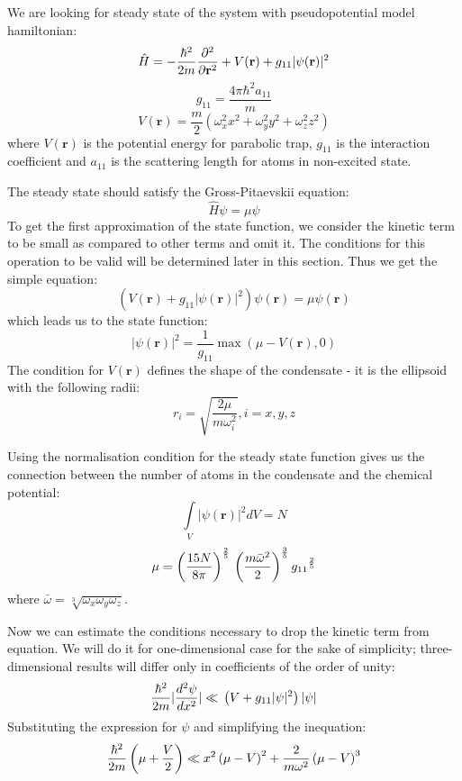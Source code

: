 \documentclass[12pt,notitlepage]{report}
\author{Bogdan Opanchuk}
\begin{document}
We are looking for steady state of the system with pseudopotential model hamiltonian:
\[ 
\hat{H} = -\frac{\hbar^2}{2m} \frac{\partial^2}{\partial \mathbf{r}^2} + \\
V(\mathbf{r}) + \\
g_{11} \vert \psi(\mathbf{r}) \vert^2 
\]
\[g_{11} = \frac{4 \pi \hbar^2 a_{11}}{m}\]
\[ V(\mathbf{r}) = \frac{m}{2} \left( \omega_x^2 x^2 + \omega_y^2 y^2 + \omega_z^2 z^2 \right) \]
where $V(\mathbf{r})$ is the potential energy for parabolic trap, $g_{11}$ is the interaction coefficient
and $a_{11}$ is the scattering length for atoms in non-excited state.

The steady state should satisfy the Gross-Pitaevskii equation:
\[ \hat{H} \psi = \mu \psi \]
To get the first approximation of the state function, we consider the kinetic term to be small as compared to other terms and omit it. The conditions for this operation to be valid will be determined later in this section. Thus we get the simple equation:
\[ \left( V(\mathbf{r}) + g_{11} \vert \psi(\mathbf{r}) \vert^2 \right) \psi(\mathbf{r}) = \mu \psi(\mathbf{r}) \]
which leads us to the state function:
\[ \vert \psi(\mathbf{r}) \vert^2 = \frac{1}{g_{11}} \max \left( \mu - V(\mathbf{r}), 0 \right) \]
The condition for $V(\mathbf{r})$ defines the shape of the condensate - it is the ellipsoid with the following radii:
\[ r_i = \sqrt{\frac{2 \mu}{m \omega_i^2}}, i = x, y, z \]

Using the normalisation condition for the steady state function gives us the connection between the number of atoms in the condensate and the chemical potential:
\[ \int\limits_{V} \vert \psi(\mathbf{r}) \vert^2 dV = N \]
\[ 
\mu = \left( \frac{15 N}{8 \pi} \right)^\frac{2}{5} \\
\left( \frac{m \bar{\omega}^2}{2} \right)^\frac{3}{5} \\
{g_{11}}^\frac{2}{5}
\]
where $\bar{\omega} = \sqrt[3]{\omega_x \omega_y \omega_z}$.

Now we can estimate the conditions necessary to drop the kinetic term from equation. We will do it for one-dimensional case for the sake of simplicity; three-dimensional results will differ only in coefficients of the order of unity:
\[ 
\frac{\hbar^2}{2 m} \vert \frac{d^2 \psi}{d x^2} \vert \ll \\
\left( V + g_{11} \vert \psi \vert^2 \right) \vert \psi \vert
\]
Substituting the expression for $\psi$ and simplifying the inequation:
\[
\frac{\hbar^2}{2 m} \left( \mu + \frac{V}{2} \right) \ll \\
x^2 \left( \mu - V \right)^2 + \frac{2}{m \omega^2} \left( \mu - V \right)^3
\]
\end{document}
